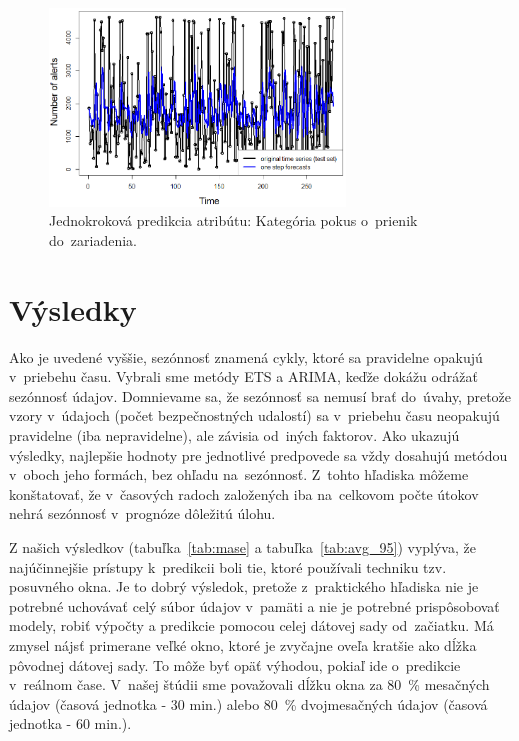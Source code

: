 \documentclass[thesismargins, thesislinespacing, openright, upjsfrontpage]{rnthesis}
\begin{document}
\begin{figure}[h]
  \centering
  \includegraphics[width=0.7\textwidth]{images/item62_1step_forecasts_new.eps}
  \caption{Jednokroková predikcia atribútu: Kategória pokus o~prienik do~zariadenia. }
  \label{fig:forecast_attempt_exploit}
\end{figure}

\section{Výsledky}

Ako je uvedené vyššie, sezónnosť znamená cykly, ktoré sa pravidelne opakujú v~priebehu času. Vybrali sme metódy ETS a ARIMA, keďže dokážu odrážať sezónnosť údajov. Domnievame sa, že sezónnosť sa nemusí brať do~úvahy, pretože vzory v~údajoch (počet bezpečnostných udalostí) sa v~priebehu času neopakujú pravidelne (iba nepravidelne), ale závisia od~iných faktorov. Ako ukazujú výsledky, najlepšie hodnoty pre jednotlivé predpovede sa vždy dosahujú metódou v~oboch jeho formách, bez ohľadu na~sezónnosť. Z~tohto hľadiska môžeme konštatovať, že v~časových radoch založených iba na~celkovom počte útokov nehrá sezónnosť v~prognóze dôležitú úlohu.

Z našich výsledkov (tabuľka~\ref{tab:mase} a tabuľka~\ref{tab:avg_95}) vyplýva, že najúčinnejšie prístupy k~predikcii boli tie, ktoré používali techniku tzv. posuvného okna. Je to dobrý výsledok, pretože z~praktického hľadiska nie je potrebné uchovávať celý súbor údajov v~pamäti a nie je potrebné prispôsobovať modely, robiť výpočty a predikcie pomocou celej dátovej sady od~začiatku. Má zmysel nájsť primerane veľké okno, ktoré je zvyčajne oveľa kratšie ako dĺžka pôvodnej dátovej sady. To môže byť opäť výhodou, pokiaľ ide o~predikcie v~reálnom čase. V~našej štúdii sme považovali dĺžku okna za 80~\% mesačných údajov (časová jednotka - 30 min.) alebo 80~\% dvojmesačných údajov (časová jednotka - 60 min.).
\end{document}
